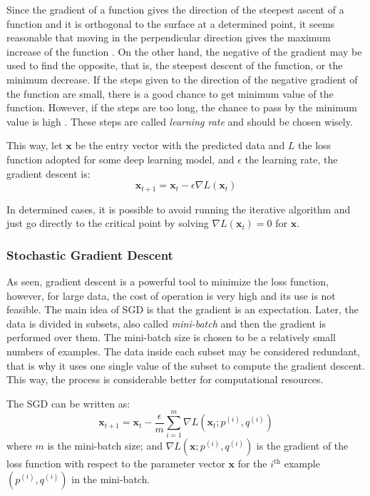 Since the gradient of a function gives the direction of the steepest ascent of a function and it is orthogonal to the surface at a determined point, it seems reasonable that moving in the perpendicular direction gives the maximum increase of the function \cite{stewart2016}.
On the other hand, the negative of the gradient may be used to find the opposite, that is, the steepest descent of the function, or the minimum decrease.
If the steps given to the direction of the negative gradient of the function are small, there is a good chance to get minimum value of the function.
However, if the steps are too long, the chance to pass by the minimum value is high \cite{nielsen2015}.
These steps are called \emph{learning rate} and should be chosen wisely.

This way, let \(\mathbf{x}\) be the entry vector with the predicted data and \(L\) the loss function adopted for some deep learning model, and \(\epsilon\) the learning rate, the gradient descent is:
%
\begin{equation}
    \mathbf{x}_{t+1} = \mathbf{x}_t - \epsilon \nabla L(\mathbf{x}_t)
\end{equation}

In determined cases, it is possible to avoid running the iterative algorithm and just go directly to the critical point by solving \(\nabla L(\mathbf{x}_t) = 0\) for \(\mathbf{x}\).

\subsubsection*{Stochastic Gradient Descent}

As seen, gradient descent is a powerful tool to minimize the loss function, however, for large data, the cost of operation is very high and its use is not feasible. 
The main idea of SGD is that the gradient is an expectation.
Later, the data is divided in subsets, also called \emph{mini-batch} and then the gradient is performed over them.
The mini-batch size is chosen to be a relatively small numbers of examples.
The data inside each subset may be considered redundant, that is why it uses one single value of the subset to compute the gradient descent.
This way, the process is considerable better for computational resources.

The SGD can be written as:
%
\begin{equation}
    \mathbf{x}_{t+1} = \mathbf{x}_t - \frac{\epsilon}{m} \sum_{i=1}^m \nabla L(\mathbf{x}_t; p^{(i)},q^{(i)})
\end{equation}
%
where \(m\)  is the mini-batch size; and \(\nabla L(\mathbf{x}; p^{(i)}, q^{(i)})\) is the gradient of the loss function with respect to the parameter vector \(\mathbf{x}\) for the \(i^{\text{th}}\) example \((p^{(i)}, q^{(i)})\) in the mini-batch.

